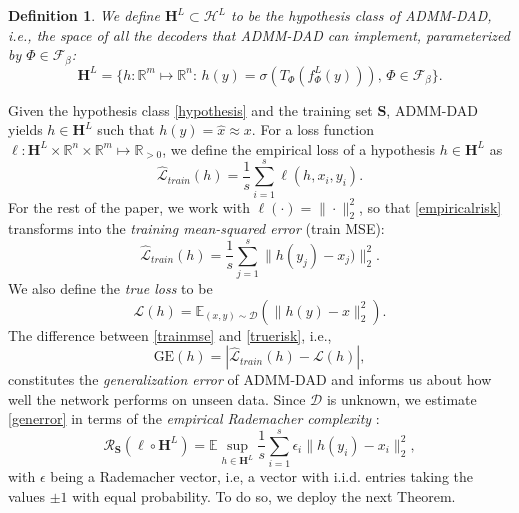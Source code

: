 \documentclass[preprint,12pt]{elsarticle}
\newtheorem{definition}[theorem]{Definition}
\newcommand{\rn}{\mathbb{R}^n}
\newcommand{\hl}{\mathcal{H}^L}
\begin{document}
\begin{definition}
    We define $\mathbf{H}^L\subset\hl$ to be the hypothesis class of ADMM-DAD, i.e., the space of all the decoders that ADMM-DAD can implement, parameterized by $\Phi\in\mathcal{F}_{\beta }$:
\begin{equation}\label{hypothesis}
    \mathbf{H}^L=\{ h:\mathbb{R}^m\mapsto\rn:\, h(y)=\sigma(T_\Phi(f^L_{\Phi}(y))),\,\Phi\in\mathcal{F}_{\beta }\}.
\end{equation}
\end{definition} 
Given the hypothesis class \eqref{hypothesis} and the training set $\mathbf{S}$, ADMM-DAD yields $h\in\mathbf{H}^L$ such that $h(y)=\hat{x}\approx x$. For a loss function $\ell:\mathbf{H}^L\times\rn\times\mathbb{R}^m\mapsto\mathbb{R}_{>0}$, we define the empirical loss of a hypothesis $h\in\mathbf{H}^L$ as
\begin{equation}\label{empiricalrisk}
    \mathcal{\hat{L}}_{train}(h)=\frac{1}{s}\sum_{i=1}^s\ell(h,x_i,y_i).
\end{equation}
For the rest of the paper, we work with $\ell(\cdot)=\|\cdot\|_2^2$, so that \eqref{empiricalrisk} transforms into the \emph{training mean-squared error} (train MSE):
\begin{equation}\label{trainmse}
    \mathcal{\hat{L}}_{train}(h)=\frac{1}{s}\sum_{j=1}^s\|h(y_j)-x_j)\|_2^2.
\end{equation}
We also define the \textit{true loss} to be
\begin{equation}\label{truerisk}
    \mathcal{L}(h)=\mathbb{E}_{(x,y)\sim\mathcal{D}}(\|h(y)-x\|_2^2).
\end{equation}
The difference between \eqref{trainmse} and \eqref{truerisk}, i.e.,
\begin{equation}\label{generror}
    \text{GE}(h)=|\mathcal{\hat{L}}_{train}(h)-\mathcal{L}(h)|,
\end{equation}
constitutes the \emph{generalization error} of ADMM-DAD and informs us about how well the network performs on unseen data. Since $\mathcal{D}$ is unknown, we estimate \eqref{generror} in terms of the \emph{empirical Rademacher complexity} \cite{shalev}:
\begin{equation}
    \label{erc}
    \mathcal{R}_{\mathbf{S}}(\ell\circ\mathbf{H}^L)=\mathbb{E}\sup_{h\in\mathbf{H}^L}\frac{1}{s}\sum_{i=1}^s\epsilon_i\|h(y_i)-x_i\|_2^2,
\end{equation}
with $\epsilon$ being a Rademacher vector, i.e, a vector with i.i.d. entries taking the values $\pm1$ with equal probability. To do so, we deploy the next Theorem.
\end{document}
